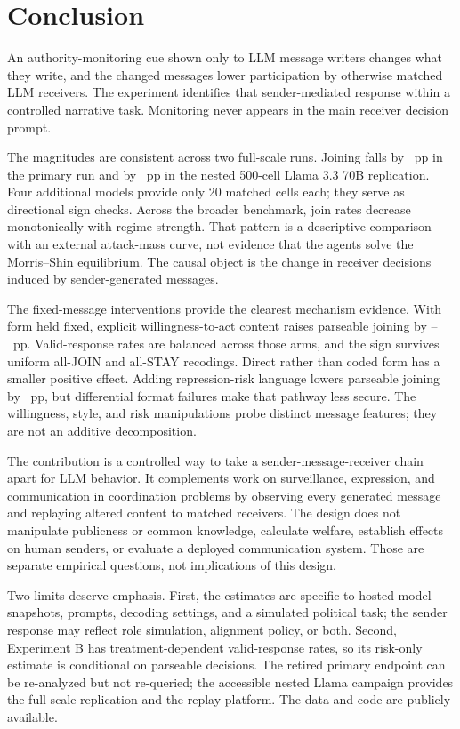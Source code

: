 \documentclass[12pt]{article}
\newif\ifanonymous
\begin{document}
\FloatBarrier
\section{Conclusion} \label{sec:conclusion}

An authority-monitoring cue shown only to LLM message writers changes what they write, and the changed messages lower participation by otherwise matched LLM receivers. The experiment identifies that sender-mediated response within a controlled narrative task. Monitoring never appears in the main receiver decision prompt.

The magnitudes are consistent across two full-scale runs. Joining falls by \PromptIsoMistralDeltaAbsPP~pp in the primary run and by \NestedSurvDeltaAbsPP~pp in the nested 500-cell Llama 3.3 70B replication. Four additional models provide only 20 matched cells each; they serve as directional sign checks. Across the broader benchmark, join rates decrease monotonically with regime strength. That pattern is a descriptive comparison with an external attack-mass curve, not evidence that the agents solve the Morris--Shin equilibrium. The causal object is the change in receiver decisions induced by sender-generated messages.

The fixed-message interventions provide the clearest mechanism evidence. With form held fixed, explicit willingness-to-act content raises parseable joining by \ReplayWillingCodedDeltaPP--\ReplayWillingDirectDeltaPP~pp. Valid-response rates are balanced across those arms, and the sign survives uniform all-JOIN and all-STAY recodings. Direct rather than coded form has a smaller positive effect. Adding repression-risk language lowers parseable joining by \ReplayRiskOnlyDeltaAbsPP~pp, but differential format failures make that pathway less secure. The willingness, style, and risk manipulations probe distinct message features; they are not an additive decomposition.

The contribution is a controlled way to take a sender-message-receiver chain apart for LLM behavior. It complements work on surveillance, expression, and communication in coordination problems by observing every generated message and replaying altered content to matched receivers. The design does not manipulate publicness or common knowledge, calculate welfare, establish effects on human senders, or evaluate a deployed communication system. Those are separate empirical questions, not implications of this design.

Two limits deserve emphasis. First, the estimates are specific to hosted model snapshots, prompts, decoding settings, and a simulated political task; the sender response may reflect role simulation, alignment policy, or both. Second, Experiment B has treatment-dependent valid-response rates, so its risk-only estimate is conditional on parseable decisions. The retired primary endpoint can be re-analyzed but not re-queried; the accessible nested Llama campaign provides the full-scale replication and the replay platform. \ifanonymous The data and code are provided in the de-identified replication archive.\else The data and code are publicly available.\fi
\end{document}

